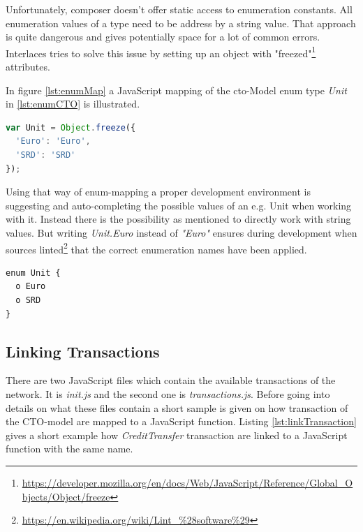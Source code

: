 Unfortunately, composer doesn't offer static access to enumeration constants. All enumeration values of a type need to be address by a string value. That approach is quite dangerous and gives potentially space for a lot of common errors. Interlaces tries to solve this issue by setting up an object with "freezed"\footnote{\url{https://developer.mozilla.org/en/docs/Web/JavaScript/Reference/Global_Objects/Object/freeze}} attributes.

In figure \ref{lst:enumMap} a JavaScript mapping of the cto-Model enum type \textit{Unit} in \ref{lst:enumCTO} is illustrated.

\begin{center}
\begin{minipage}{0.8\textwidth}
\small
\begin{lstlisting}[language=javascript,firstnumber=1,caption={\bf\small JavaScript enumeration mapping}, captionpos=b,label=lst:enumMap]
var Unit = Object.freeze({
  'Euro': 'Euro',
  'SRD': 'SRD'
});
\end{lstlisting}
\end{minipage}
\end{center}

Using that way of enum-mapping a proper development environment is suggesting and auto-completing the possible values of an e.g. Unit when working with it. Instead there is the possibility as mentioned to directly work with string values. But writing \textit{Unit.Euro} instead of \textit{"Euro"} ensures during development when sources linted\footnote{\url{https://en.wikipedia.org/wiki/Lint_\%28software\%29}} that the correct enumeration names have been applied.

\begin{center}
\begin{minipage}{0.8\textwidth}
\small
\begin{lstlisting}[language=cto,firstnumber=1,caption={\bf\small enum in CTO-model}, captionpos=b,label=lst:enumCTO]
enum Unit {
  o Euro
  o SRD
}
\end{lstlisting}
\end{minipage}
\end{center}

\subsection{Linking Transactions}
\label{sec:link transactions}

There are two JavaScript files which contain the available transactions of the network. It is \textit{init.js} and the second one is \textit{transactions.js}. Before going into details on what these files contain a short sample is given on how transaction of the CTO-model are mapped to a JavaScript function. Listing \ref{lst:linkTransaction} gives a short example how \textit{CreditTransfer} transaction are linked to a JavaScript function with the same name.


